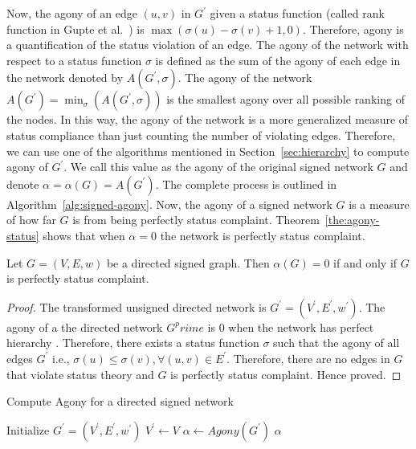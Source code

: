 Now, the agony of an edge $(u,v)$ in $G^\prime$ given a status function (called rank function in Gupte et al.\ \cite{gupte2011finding}) is $\max(\sigma(u)-\sigma(v)+1,0)$.
Therefore, agony is a quantification of the status violation of an edge.
The agony of the network with respect to a status function $\sigma$ is defined as the sum of the agony of each edge in the network denoted by $A(G^\prime,\sigma)$.
The agony of the network $A(G^\prime)= \min_\sigma(A(G^\prime,\sigma))$ is the smallest agony over all possible ranking of the nodes.
In this way, the agony of the network is a more generalized measure of status compliance than just counting the number of violating edges.
Therefore, we can use one of the algorithms mentioned in Section~\ref{sec:hierarchy} to compute agony of $G^\prime$.
We call this value as the agony of the original signed network $G$ and denote $\alpha = \alpha(G) = A(G^\prime)$.
The complete process is outlined in Algorithm~\ref{alg:signed-agony}.
Now, the agony of a signed network $G$ is a measure of how far $G$ is from being perfectly status complaint.
Theorem~\ref{the:agony-status} shows that when $\alpha=0$ the network is perfectly status complaint. 

\begin{theorem}
\label{the:agony-status}
Let $G=(V,E,w)$ be a directed signed graph.
Then $\alpha(G)=0$ if and only if $G$ is perfectly status complaint.
\end{theorem}
\begin{proof}
    The transformed unsigned directed network is $G^\prime=(V^\prime,E^\prime,w^\prime)$. The agony of a the directed network $G^prime$ is 0 when the network has perfect hierarchy \cite{gupte2011finding}. Therefore, there exists a status function $\sigma$ such that the agony of all edges $G^\prime$ i.e., $\sigma(u) \leq \sigma(v), \forall (u,v)\in E^\prime$. Therefore, there are no edges in $G$ that violate status theory and $G$ is perfectly status complaint. Hence proved.
\end{proof}

\begin{algorithm}[htp]
    \DontPrintSemicolon
    \caption{Compute Agony for a directed signed network }
    \label{alg:signed-agony}
    Initialize $G^\prime = (V^\prime,E^\prime,w^\prime)$\;
    $V^\prime \leftarrow V$\;
    $\alpha \leftarrow Agony(G^\prime)$\; 
    \Return $\alpha$\;
\end{algorithm}

